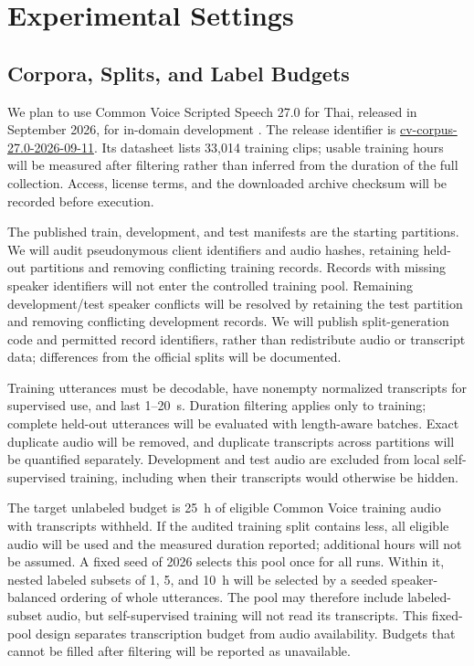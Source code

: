 \section{Experimental Settings}
\label{sec:experiments}

\subsection{Corpora, Splits, and Label Budgets}
We plan to use Common Voice Scripted Speech 27.0 for Thai, released in September 2026, for in-domain development \cite{cv27thai}. The release identifier is \url{cv-corpus-27.0-2026-09-11}. Its datasheet lists 33,014 training clips; usable training hours will be measured after filtering rather than inferred from the duration of the full collection. Access, license terms, and the downloaded archive checksum will be recorded before execution.

The published train, development, and test manifests are the starting partitions. We will audit pseudonymous client identifiers and audio hashes, retaining held-out partitions and removing conflicting training records. Records with missing speaker identifiers will not enter the controlled training pool. Remaining development/test speaker conflicts will be resolved by retaining the test partition and removing conflicting development records. We will publish split-generation code and permitted record identifiers, rather than redistribute audio or transcript data; differences from the official splits will be documented.

Training utterances must be decodable, have nonempty normalized transcripts for supervised use, and last 1--20~s. Duration filtering applies only to training; complete held-out utterances will be evaluated with length-aware batches. Exact duplicate audio will be removed, and duplicate transcripts across partitions will be quantified separately. Development and test audio are excluded from local self-supervised training, including when their transcripts would otherwise be hidden.

The target unlabeled budget is 25~h of eligible Common Voice training audio with transcripts withheld. If the audited training split contains less, all eligible audio will be used and the measured duration reported; additional hours will not be assumed. A fixed seed of 2026 selects this pool once for all runs. Within it, nested labeled subsets of 1, 5, and 10~h will be selected by a seeded speaker-balanced ordering of whole utterances. The pool may therefore include labeled-subset audio, but self-supervised training will not read its transcripts. This fixed-pool design separates transcription budget from audio availability. Budgets that cannot be filled after filtering will be reported as unavailable.

